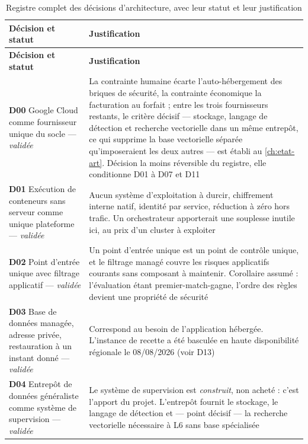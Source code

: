 \begingroup
\small
\setlength{\tabcolsep}{4pt}
\setlength{\LTpre}{4pt}
\setlength{\LTpost}{4pt}
\begin{longtable}{|P{3.2cm}|P{12.1cm}|}
\caption[Registre complet des décisions d'architecture]{Registre complet des décisions
d'architecture, avec leur statut et leur justification}
\label{tab:registre-decisions-annexe} \\
\hline
\textbf{Décision et statut} & \textbf{Justification} \\
\hline
\endfirsthead
\hline
\textbf{Décision et statut} & \textbf{Justification} \\
\hline
\endhead
\textbf{D00} Google Cloud comme fournisseur unique du socle --- \emph{validée} &
La contrainte humaine écarte l'auto-hébergement des briques de sécurité, la contrainte économique
la facturation au forfait ; entre les trois fournisseurs restants, le critère décisif --- stockage,
langage de détection et recherche vectorielle dans un même entrepôt, ce qui supprime la base
vectorielle séparée qu'imposeraient les deux autres --- est établi au \cref{ch:etat-art}.
Décision la moins réversible du registre, elle conditionne D01 à D07 et D11 \\ \hline
\textbf{D01} Exécution de conteneurs sans serveur comme unique plateforme --- \emph{validée} &
Aucun système d'exploitation à durcir, chiffrement interne natif, identité par service, réduction à
zéro hors trafic. Un orchestrateur apporterait une souplesse inutile ici, au prix d'un cluster à
exploiter \\ \hline
\textbf{D02} Point d'entrée unique avec filtrage applicatif --- \emph{validée} &
Un point d'entrée unique est un point de contrôle unique, et le filtrage managé couvre les risques
applicatifs courants sans composant à maintenir. Corollaire assumé : l'évaluation étant
premier-match-gagne, l'ordre des règles devient une propriété de sécurité \\ \hline
\textbf{D03} Base de données managée, adresse privée, restauration à un instant donné ---
\emph{validée} &
Correspond au besoin de l'application hébergée. L'instance de recette a été basculée en haute
disponibilité régionale le 08/08/2026 (voir D13) \\ \hline
\textbf{D04} Entrepôt de données généraliste comme système de supervision --- \emph{validée} &
Le système de supervision est \emph{construit}, non acheté : c'est l'apport du projet. L'entrepôt
fournit le stockage, le langage de détection et --- point décisif --- la recherche vectorielle
nécessaire à L6 sans base spécialisée \\ \hline

\end{longtable}

